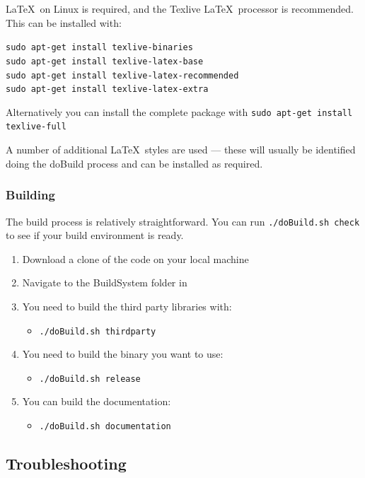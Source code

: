 \LaTeX\ on Linux is required, and the Texlive \LaTeX\ processor is recommended. This can be installed with:

\texttt{sudo apt-get install texlive-binaries} \\
\texttt{sudo apt-get install texlive-latex-base} \\
\texttt{sudo apt-get install texlive-latex-recommended} \\
\texttt{sudo apt-get install texlive-latex-extra} \

Alternatively you can install the complete package with 
\texttt{sudo apt-get install texlive-full}

A number of additional \LaTeX\ styles are used --- these will usually be identified doing the doBuild process and can be installed as required. 

\subsubsection{Building \CNAME}

The build process is relatively straightforward. You can run \texttt{./doBuild.sh check} to see if your build environment is ready.

\begin{enumerate}
	\item Download a clone of the code on your local machine
	\item Navigate to the BuildSystem folder in 
	\item You need to build the third party libraries with:
	\begin{itemize}
	    \item \texttt{./doBuild.sh thirdparty}
	\end{itemize}
	\item You need to build the binary you want to use:
	\begin{itemize}
		\item \texttt{./doBuild.sh release}
	\end{itemize}
	\item You can build the documentation:
	\begin{itemize}
		\item \texttt{./doBuild.sh documentation}
	\end{itemize}
\end{enumerate}

\subsection{Troubleshooting}

